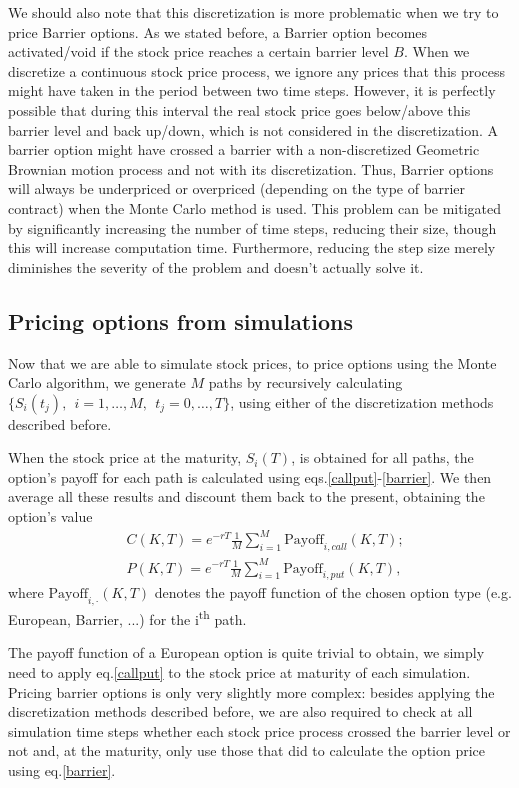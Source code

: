 We should also note that this discretization is more problematic when we try to price Barrier options. As we stated before, a Barrier option becomes activated/void if the stock price reaches a certain barrier level $B$. When we discretize a continuous stock price process, we ignore any prices that this process might have taken in the period between two time steps. However, it is perfectly possible that during this interval the real stock price goes below/above this barrier level and back up/down, which is not considered in the discretization. A barrier option might have crossed a barrier with a non-discretized Geometric Brownian motion process and not with its discretization. Thus, Barrier options will always be underpriced or overpriced (depending on the type of barrier contract) when the Monte Carlo method is used. This problem can be mitigated by significantly increasing the number of time steps, reducing their size, though this will increase computation time. Furthermore, reducing the step size merely diminishes the severity of the problem and doesn't actually solve it.


\subsection{Pricing options from simulations}
\label{subsection:Pricing options from simulations}
Now that we are able to simulate stock prices, to price options using the Monte Carlo algorithm, we generate $M$ paths by recursively calculating $\{S_i(t_j),\ \ i=1,\ldots,M,\ \ t_j=0,\ldots,T\}$, using either of the discretization methods described before.

When the stock price at the maturity, $S_i(T)$, is obtained for all paths, the option's payoff for each path is calculated using eqs.\eqref{callput}-\eqref{barrier}. We then average all these results and discount them back to the present, obtaining the option's value
\begin{subequations}\label{mcpricer}
\begin{align}
&C(K,T)=e^{-rT}\frac{1}{M}\sum_{i=1}^M\text{Payoff}_{i,call}(K,T);\\
&P(K,T)=e^{-rT}\frac{1}{M}\sum_{i=1}^M\text{Payoff}_{i,put}(K,T),
\end{align}
\end{subequations}
\noindent where $\text{Payoff}_{i,\cdot}(K,T)$ denotes the payoff function of the chosen option type (e.g. European, Barrier, ...) for the i\textsuperscript{th} path.
 

The payoff function of a European option is quite trivial to obtain, we simply need to apply eq.\eqref{callput} to the stock price at maturity of each simulation.
Pricing barrier options is only very slightly more complex: besides applying the discretization methods described before, we are also required to check at all simulation time steps whether each stock price process crossed the barrier level or not and, at the maturity, only use those that did to calculate the option price using eq.\eqref{barrier}.

